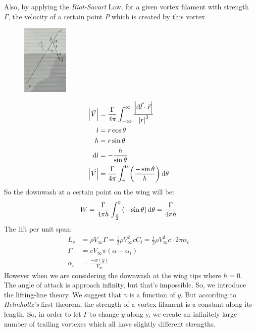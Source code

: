 \documentclass[11pt]{article}
\begin{document}
Also, by applying the \textit{Biot-Savart} Law,  for a given vortex filament with strength $\Gamma$, the velocity of a certain point $P$ which is created by this vortex
\begin{figure}[H]
  \centering
  \includegraphics[width=0.2\textwidth]{./img/diagram5.png}
  \caption{}
\end{figure}
\begin{align}
  \left| \vec{V} \right| &= \frac{\Gamma}{4\pi} \int_{-\infty}^{\infty} \frac{\left| \dif \vec{l} \cdot \vec{r} \right| }{ \left| r \right|^3}\\
  l &= r\cos{\theta}\\
  h &= r\sin{\theta}\\
  \dif l &= -\frac{h}{\sin{\theta}}\\
  \left| \vec{V} \right| &= \frac{\Gamma}{4\pi} \int_{\pi}^0 \left(\frac{-\sin{\theta}}{h}\right) \dif \theta\\
\end{align}
So the downwash at a certain point on the wing will be:
\begin{align}
  W = \frac{\Gamma}{4\pi h} \int_{\frac{\pi}{2}}^0\left(-\sin{\theta}\right)\dif \theta = \frac{\Gamma}{4\pi h}
\end{align}
The lift per unit span:
\begin{align}
  L_v &= \rho V_{\infty} \Gamma = \frac{1}{2}\rho V_{\infty}^2 c C_l = \frac{1}{2} \rho V_{\infty}^2 c \cdot 2\pi \alpha_e\\
  \Gamma &= cV_{\infty}\pi \left(\alpha - \alpha_i\right)\\
  \alpha_i &= \frac{-w\left(y\right)}{V_{\infty}}
\end{align}
However when we are considering the downwash at the wing tips where $h=0$. The angle of attack is approach infinity, but that's impossible. So, we introduce the lifting-line theory. We suggest that $\gamma$ is a function of $y$. But according to \textit{Helmholtz's} first theorem, the strength of a vortex filament is a constant along its length. So, in order to let $\Gamma$ to change $y$ along y, we create an infinitely large number of trailing vortexes which all have slightly different strengths.
\end{document}
